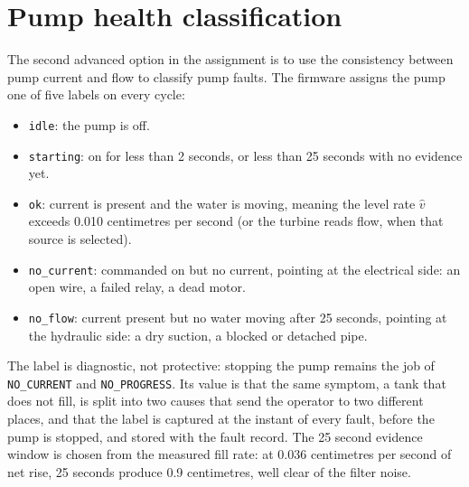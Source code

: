 \section{Pump health classification}

The second advanced option in the assignment is to use the consistency between pump current and flow to classify pump faults. The firmware assigns the pump one of five labels on every cycle:

\begin{itemize}
\item \texttt{idle}: the pump is off.
\item \texttt{starting}: on for less than 2 seconds, or less than 25 seconds with no evidence yet.
\item \texttt{ok}: current is present and the water is moving, meaning the level rate $\hat{v}$ exceeds 0.010 centimetres per second (or the turbine reads flow, when that source is selected).
\item \texttt{no\_current}: commanded on but no current, pointing at the electrical side: an open wire, a failed relay, a dead motor.
\item \texttt{no\_flow}: current present but no water moving after 25 seconds, pointing at the hydraulic side: a dry suction, a blocked or detached pipe.
\end{itemize}

The label is diagnostic, not protective: stopping the pump remains the job of \texttt{NO\_CURRENT} and \texttt{NO\_PROGRESS}. Its value is that the same symptom, a tank that does not fill, is split into two causes that send the operator to two different places, and that the label is captured at the instant of every fault, before the pump is stopped, and stored with the fault record. The 25 second evidence window is chosen from the measured fill rate: at 0.036 centimetres per second of net rise, 25 seconds produce 0.9 centimetres, well clear of the filter noise.

